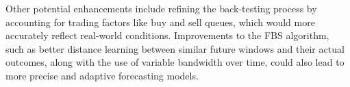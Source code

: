 \documentclass[preprint,12pt,authoryear]{elsarticle}
\begin{document}
Other potential enhancements include refining the back-testing process by accounting for trading factors like buy and sell queues, which would more accurately reflect real-world conditions. Improvements to the FBS algorithm, such as better distance learning between similar future windows and their actual outcomes, along with the use of variable bandwidth over time, could also lead to more precise and adaptive forecasting models.




 

\end{document}
